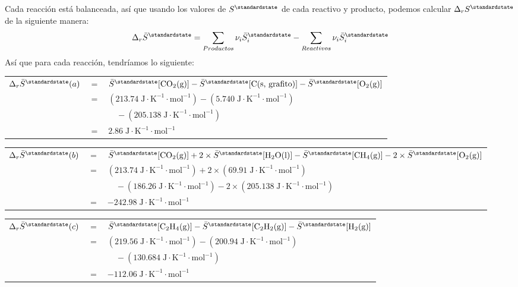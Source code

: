 \documentclass[a4paper,12pt]{article}
\begin{document}
\begin{enumerate}
Cada reacci\'on est\'a balanceada, as\'i que usando los valores de $S^\standardstate$ de cada reactivo y producto, podemos calcular $\Delta_rS^\standardstate$ de la siguiente manera:
$$\Delta_r\bar{S}^\standardstate=\sum_{Productos}\nu_i\bar{S}_i^\standardstate-\sum_{Reactivos}\nu_i\bar{S}_i^\standardstate$$
As\'i que para cada reacci\'on, tendr\'iamos lo siguiente: \\
\begin{tabular}{r c l}
$\Delta_r\bar{S}^\standardstate(a)$ & $=$ & $\bar{S}^\standardstate[\mbox{CO}_2\mbox{(g)}]-\bar{S}^\standardstate[\mbox{C(s, grafito)}]-\bar{S}^\standardstate[\mbox{O}_2\mbox{(g)}]$ \\
& $=$ & $(213.74\;\mbox{J}\cdot\mbox{K}^{-1}\cdot\mbox{mol}^{-1})-(5.740\;\mbox{J}\cdot\mbox{K}^{-1}\cdot\mbox{mol}^{-1})$ \\
& & $\quad-(205.138\;\mbox{J}\cdot\mbox{K}^{-1}\cdot\mbox{mol}^{-1})$ \\
& $=$ & $2.86\;\mbox{J}\cdot\mbox{K}^{-1}\cdot\mbox{mol}^{-1}$
\end{tabular}

\begin{tabular}{r c l}
$\Delta_r\bar{S}^\standardstate(b)$ & $=$ & $\bar{S}^\standardstate[\mbox{CO}_2\mbox{(g)}]+2\times \bar{S}^\standardstate[\mbox{H}_2\mbox{O(l)}]-\bar{S}^\standardstate[\mbox{CH}_4\mbox{(g)}]-2\times \bar{S}^\standardstate[\mbox{O}_2\mbox{(g)}]$ \\
& $=$ & $(213.74\;\mbox{J}\cdot\mbox{K}^{-1}\cdot\mbox{mol}^{-1})+2\times (69.91\;\mbox{J}\cdot\mbox{K}^{-1}\cdot\mbox{mol}^{-1})$ \\
& & $\quad-(186.26\;\mbox{J}\cdot\mbox{K}^{-1}\cdot\mbox{mol}^{-1})-2\times (205.138\;\mbox{J}\cdot\mbox{K}^{-1}\cdot\mbox{mol}^{-1})$ \\
& $=$ & $-242.98\;\mbox{J}\cdot\mbox{K}^{-1}\cdot\mbox{mol}^{-1}$
\end{tabular}

\begin{tabular}{r c l}
$\Delta_r\bar{S}^\standardstate(c)$ & $=$ & $\bar{S}^\standardstate[\mbox{C}_2\mbox{H}_4\mbox{(g)}]-\bar{S}^\standardstate[\mbox{C}_2\mbox{H}_2\mbox{(g)}]-\bar{S}^\standardstate[\mbox{H}_2\mbox{(g)}]$ \\
& $=$ & $(219.56\;\mbox{J}\cdot\mbox{K}^{-1}\cdot\mbox{mol}^{-1})-(200.94\;\mbox{J}\cdot\mbox{K}^{-1}\cdot\mbox{mol}^{-1})$ \\
& & $\quad-(130.684\;\mbox{J}\cdot\mbox{K}^{-1}\cdot\mbox{mol}^{-1})$ \\
& $=$ & $-112.06\;\mbox{J}\cdot\mbox{K}^{-1}\cdot\mbox{mol}^{-1}$
\end{tabular}

\end{enumerate}
\end{document}
